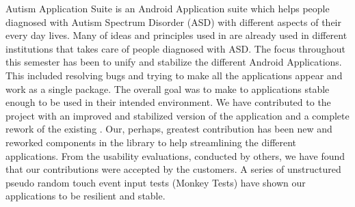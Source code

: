 
\giraf Autism Application Suite is an Android Application suite which helps people diagnosed with Autism Spectrum Disorder (ASD) with different aspects of their every day lives. Many of ideas and principles used in \giraf are already used in different institutions that takes care of people diagnosed with ASD.     
The focus throughout this semester has been to unify and stabilize the different \giraf Android Applications. This included resolving bugs and trying to make all the applications appear and work as a single package. The overall goal was to make to applications stable enough to be used in their intended environment.   
We have contributed to the project with an improved and stabilized version of the \giraf \launcher application and a complete rework of the existing \giraf \ct. Our, perhaps, greatest contribution has been new and reworked components in the \gc library to help streamlining the different applications.    
From the usability evaluations, conducted by others, we have found that our contributions were accepted by the customers. A series of unstructured pseudo random touch event input tests (Monkey Tests) have shown our applications to be resilient and stable.
